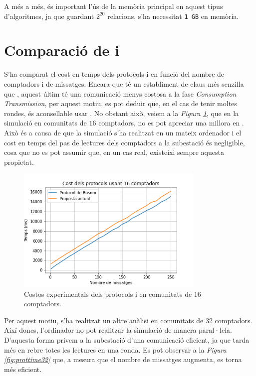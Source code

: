 A més a més, és important l'ús de la memòria principal en aquest tipus d'algoritmes, ja que guardant $2^{20}$ relacions, s'ha necessitat \texttt{1 GB} en memòria.
\section{Comparació de \cite{recsi} i \cite{busom}}
S'ha comparat el cost en temps dels protocols \cite{recsi} i \cite{busom} en funció del nombre de comptadors i de missatges. Encara que \cite{busom} té un establiment de claus més senzilla que \cite{recsi}, aquest últim té una comunicació menys costosa a la fase \textit{Consumption Transmission}, per aquest motiu, es pot deduir que, en el cas de tenir moltes rondes, és aconsellable usar \cite{recsi}. No obstant això, veiem a la \textit{Figura \ref{fig:prottime16}}, que en la simulació en comunitats de $16$ comptadors, no es pot apreciar una millora en \cite{recsi}. Això és a causa de que la simulació s'ha realitzat en un mateix ordenador i el cost en temps del pas de lectures dels comptadors a la subestació és negligible, cosa que no es pot assumir que, en un cas real, existeixi sempre aquesta propietat.
\begin{figure}[H]
	\centering
	\includegraphics[width=9cm]{imgs/cost/16compt.png}
	\caption{Costos experimentals dels protocols \cite{recsi} i \cite{busom} en comunitats de 16 comptadors.}
	\label{fig:prottime16}
\end{figure}
Per aquest motiu, s'ha realitzat un altre anàlisi en comunitats de 32 comptadors. Així doncs, l'ordinador no pot realitzar la simulació de manera paral·lela. D'aquesta forma privem a la subestació d'una comunicació eficient, ja que tarda més en rebre totes les lectures en una ronda. Es pot observar a la \textit{Figura \ref{fig:prottime32}} que, a mesura que el nombre de missatges augmenta, \cite{recsi} es torna més eficient.
